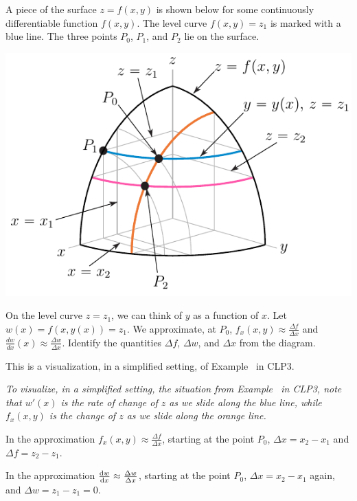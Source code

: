 \begin{solution}
\end{solution}
\begin{question}A piece of the surface $z=f(x,y)$ is shown below for some continuously differentiable function $f(x,y)$. The level curve $f(x,y)=z_1$ is marked with a blue line. The three points $P_0$, $P_1$, and $P_2$ lie on the surface.
	
\includegraphics{fig/partialTotalX.pdf}
	
	On the level curve $z=z_1$, we can think of $y$ as a function of $x$. Let $w(x)=f(x,y(x))=z_1$. We approximate, at $P_0$, $f_x(x,y) \approx \frac{\Delta f}{\Delta x}$ and $\frac{dw}{dx}(x)\approx\frac{\Delta w}{\Delta x}$. Identify the quantities $\Delta f$, $\Delta w$, and $\Delta x$ from the diagram.%
	
\end{question}
\begin{hint}
This is a visualization, in a simplified setting, of Example~ in CLP3.
\end{hint}
\begin{answer}
	
\textit{To visualize, in a simplified setting, the situation from Example~ in CLP3, note that $w'(x)$ is the rate of change of $z$ as we slide along the blue line, while $f_x(x,y)$ is the change of $z$ as we slide along the orange line.}
	
In the approximation $f_x(x,y)\approx \frac{\Delta f}{\Delta x}$, starting at the point $P_0$, $\Delta x=x_2-x_1$ and $\Delta f=z_2-z_1$.

In the approximation $\diff{w}{x}\approx \frac{\Delta w}{\Delta x}$, starting at the point $P_0$,  $\Delta x=x_2-x_1$ again, and $\Delta w=z_1-z_1=0$.

\end{answer}

